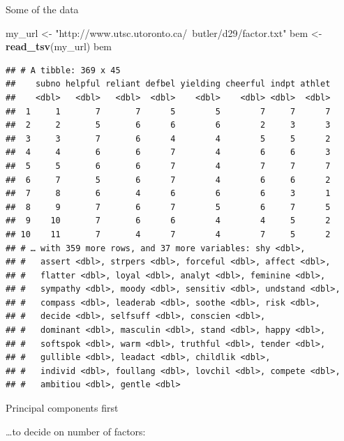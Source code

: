\documentclass[ignorenonframetext,]{beamer}
\newenvironment{Shaded}{\begin{snugshade}}{\end{snugshade}}
\newcommand{\DataTypeTok}[1]{\textcolor[rgb]{0.13,0.29,0.53}{#1}}
\newcommand{\KeywordTok}[1]{\textcolor[rgb]{0.13,0.29,0.53}{\textbf{#1}}}
\newcommand{\NormalTok}[1]{#1}
\newcommand{\OperatorTok}[1]{\textcolor[rgb]{0.81,0.36,0.00}{\textbf{#1}}}
\newcommand{\StringTok}[1]{\textcolor[rgb]{0.31,0.60,0.02}{#1}}
\begin{document}
\begin{frame}[fragile]{Some of the data}
\protect\hypertarget{some-of-the-data}{}

\scriptsize

\begin{Shaded}
\begin{Highlighting}[]
\NormalTok{my_url <-}\StringTok{ "http://www.utsc.utoronto.ca/~butler/d29/factor.txt"}
\NormalTok{bem <-}\StringTok{ }\KeywordTok{read_tsv}\NormalTok{(my_url)}
\NormalTok{bem}
\end{Highlighting}
\end{Shaded}

\begin{verbatim}
## # A tibble: 369 x 45
##    subno helpful reliant defbel yielding cheerful indpt athlet
##    <dbl>   <dbl>   <dbl>  <dbl>    <dbl>    <dbl> <dbl>  <dbl>
##  1     1       7       7      5        5        7     7      7
##  2     2       5       6      6        6        2     3      3
##  3     3       7       6      4        4        5     5      2
##  4     4       6       6      7        4        6     6      3
##  5     5       6       6      7        4        7     7      7
##  6     7       5       6      7        4        6     6      2
##  7     8       6       4      6        6        6     3      1
##  8     9       7       6      7        5        6     7      5
##  9    10       7       6      6        4        4     5      2
## 10    11       7       4      7        4        7     5      2
## # … with 359 more rows, and 37 more variables: shy <dbl>,
## #   assert <dbl>, strpers <dbl>, forceful <dbl>, affect <dbl>,
## #   flatter <dbl>, loyal <dbl>, analyt <dbl>, feminine <dbl>,
## #   sympathy <dbl>, moody <dbl>, sensitiv <dbl>, undstand <dbl>,
## #   compass <dbl>, leaderab <dbl>, soothe <dbl>, risk <dbl>,
## #   decide <dbl>, selfsuff <dbl>, conscien <dbl>,
## #   dominant <dbl>, masculin <dbl>, stand <dbl>, happy <dbl>,
## #   softspok <dbl>, warm <dbl>, truthful <dbl>, tender <dbl>,
## #   gullible <dbl>, leadact <dbl>, childlik <dbl>,
## #   individ <dbl>, foullang <dbl>, lovchil <dbl>, compete <dbl>,
## #   ambitiou <dbl>, gentle <dbl>
\end{verbatim}

\normalsize

\end{frame}

\begin{frame}[fragile]{Principal components first}
\protect\hypertarget{principal-components-first}{}

\ldots to decide on number of factors:

\begin{Shaded}
\end{Shaded}

\end{frame}
\end{document}
